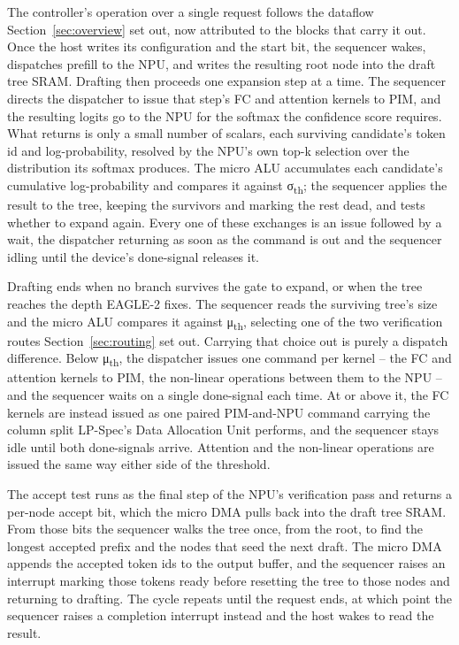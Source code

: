 \documentclass[11pt]{article}
\begin{document}
The controller's operation over a single request follows the dataflow Section~\ref{sec:overview} set out, now attributed to the blocks that carry it out. Once the host writes its configuration and the start bit, the sequencer wakes, dispatches prefill to the NPU, and writes the resulting root node into the draft tree SRAM. Drafting then proceeds one expansion step at a time. The sequencer directs the dispatcher to issue that step's FC and attention kernels to PIM, and the resulting logits go to the NPU for the softmax the confidence score requires. What returns is only a small number of scalars, each surviving candidate's token id and log-probability, resolved by the NPU's own top-k selection over the distribution its softmax produces. The micro ALU accumulates each candidate's cumulative log-probability and compares it against σ\textsubscript{th}; the sequencer applies the result to the tree, keeping the survivors and marking the rest dead, and tests whether to expand again. Every one of these exchanges is an issue followed by a wait, the dispatcher returning as soon as the command is out and the sequencer idling until the device's done-signal releases it.

Drafting ends when no branch survives the gate to expand, or when the tree reaches the depth EAGLE-2 fixes. The sequencer reads the surviving tree's size and the micro ALU compares it against μ\textsubscript{th}, selecting one of the two verification routes Section~\ref{sec:routing} set out. Carrying that choice out is purely a dispatch difference. Below μ\textsubscript{th}, the dispatcher issues one command per kernel -- the FC and attention kernels to PIM, the non-linear operations between them to the NPU -- and the sequencer waits on a single done-signal each time. At or above it, the FC kernels are instead issued as one paired PIM-and-NPU command carrying the column split LP-Spec's Data Allocation Unit performs, and the sequencer stays idle until both done-signals arrive. Attention and the non-linear operations are issued the same way either side of the threshold.

The accept test runs as the final step of the NPU's verification pass and returns a per-node accept bit, which the micro DMA pulls back into the draft tree SRAM. From those bits the sequencer walks the tree once, from the root, to find the longest accepted prefix and the nodes that seed the next draft. The micro DMA appends the accepted token ids to the output buffer, and the sequencer raises an interrupt marking those tokens ready before resetting the tree to those nodes and returning to drafting. The cycle repeats until the request ends, at which point the sequencer raises a completion interrupt instead and the host wakes to read the result.
\end{document}
